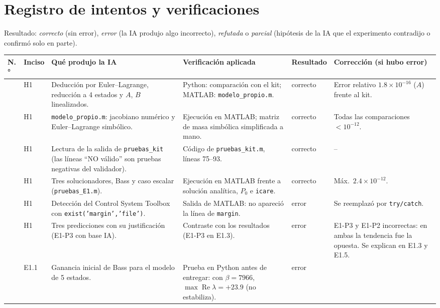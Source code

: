 \documentclass[11pt,a4paper]{article}
\begin{document}
\section{Registro de intentos y verificaciones}\label{sec:registro}
Resultado: \emph{correcto} (sin error), \emph{error} (la IA produjo algo incorrecto), \emph{refutada} o
\emph{parcial} (hipótesis de la IA que el experimento contradijo o confirmó solo en parte).

{\small
\setlength{\tabcolsep}{3pt}
\begin{longtable}{@{}>{\raggedright\arraybackslash}p{0.5cm} >{\raggedright\arraybackslash}p{1.0cm} >{\raggedright\arraybackslash}p{3.9cm} >{\raggedright\arraybackslash}p{4.1cm} >{\raggedright\arraybackslash}p{1.5cm} >{\raggedright\arraybackslash}p{4.5cm}@{}}
\toprule
N.° & Inciso & Qué produjo la IA & Verificación aplicada & Resultado & Corrección (si hubo error) \\
\midrule
\endhead
1 & H1 & Deducción por Euler--Lagrange, reducción a 4 estados y $A$, $B$ linealizados. &
Python: comparación con el kit; MATLAB: \texttt{modelo\_propio.m}. & correcto &
Error relativo $1.8\times10^{-16}$ ($A$) frente al kit. \\
2 & H1 & \texttt{modelo\_propio.m}: jacobiano numérico y Euler--Lagrange simbólico. &
Ejecución en MATLAB; matriz de masa simbólica simplificada a mano. & correcto &
Todas las comparaciones $<10^{-12}$. \\
3 & H1 & Lectura de la salida de \texttt{pruebas\_kit} (las líneas ``NO válido'' son pruebas negativas del validador). &
Código de \texttt{pruebas\_kit.m}, líneas 75--93. & correcto & -- \\
4 & H1 & Tres solucionadores, Bass y caso escalar (\texttt{pruebas\_E1.m}). &
Ejecución en MATLAB frente a solución analítica, $P_0$ e \texttt{icare}. & correcto &
Máx.\ $2.4\times10^{-12}$. \\
5 & H1 & Detección del Control System Toolbox con \texttt{exist('margin','file')}. &
Salida de MATLAB: no apareció la línea de \texttt{margin}. & error &
Se reemplazó por \texttt{try/catch}. \\
6 & H1 & Tres predicciones con su justificación (E1-P3 con base IA). &
Contraste con los resultados (E1-P3 en E1.3). & error &
E1-P3 y E1-P2 incorrectas: en ambas la tendencia fue la opuesta. Se explican en E1.3 y E1.5. \\
7 & E1.1 & Ganancia inicial de Bass para el modelo de 5 estados. &
Prueba en Python antes de entregar: con $\beta=7966$, $\max\operatorname{Re}\lambda=+23.9$ (no estabiliza). & error &

\end{longtable}}
\end{document}
